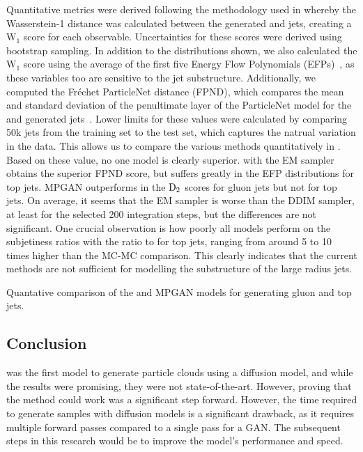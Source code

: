 Quantitative metrics were derived following the methodology used in \textcite{MPGAN} whereby the Wasserstein-1 distance was calculated between the generated and \pythia jets, creating a $\text{W}_1$ score for each observable.
Uncertainties for these scores were derived using bootstrap sampling.
In addition to the distributions shown, we also calculated the $\text{W}_1$ score using the average of the first five Energy Flow Polynomials (EFPs)~\cite{EFP}, as these variables too are sensitive to the jet substructure.
Additionally, we computed the Fréchet ParticleNet distance (FPND), which compares the mean and standard deviation of the penultimate layer of the ParticleNet model for the \pythia and generated jets~\cite{MPGAN, ParticleNet}.
Lower limits for these values were calculated by comparing 50k jets from the training set to the test set, which captures the natrual variation in the data.
This allows us to compare the various methods quantitatively in .
Based on these value, no one model is clearly superior.
\pcjedi with the EM sampler obtains the superior FPND score, but suffers greatly in the EFP distributions for top jets.
MPGAN outperforms \pcjedi in the $\text{D}_2$ scores for gluon jets but not for top jets.
On average, it seems that the EM sampler is worse than the DDIM sampler, at least for the selected 200 integration steps, but the differences are not significant.
One crucial observation is how poorly all models perform on the subjetiness ratios with the ratio to \pythia for top jets, ranging from around 5 to 10 times higher than the MC-MC comparison.
This clearly indicates that the current methods are not sufficient for modelling the substructure of the large radius jets.

\begin{table}[tp]
    \centering
    \caption{Quantative comparison of the \pcjedi and MPGAN models for generating gluon and top jets.}
    \label{tab:combined_results}
    \renewcommand{\arraystretch}{1.5}
    \resizebox{\textwidth}{!}{%
        
    }
\end{table}

\subsection{Conclusion}

\pcjedi was the first model to generate particle clouds using a diffusion model, and while the results were promising, they were not state-of-the-art.
However, proving that the method could work was a significant step forward.
However, the time required to generate samples with diffusion models is a significant drawback, as it requires multiple forward passes compared to a single pass for a GAN\@.
The subsequent steps in this research would be to improve the model's performance and speed.

